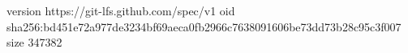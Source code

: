 version https://git-lfs.github.com/spec/v1
oid sha256:bd451e72a977de3234bf69aeca0fb2966c7638091606be73dd73b28c95c3f007
size 347382
